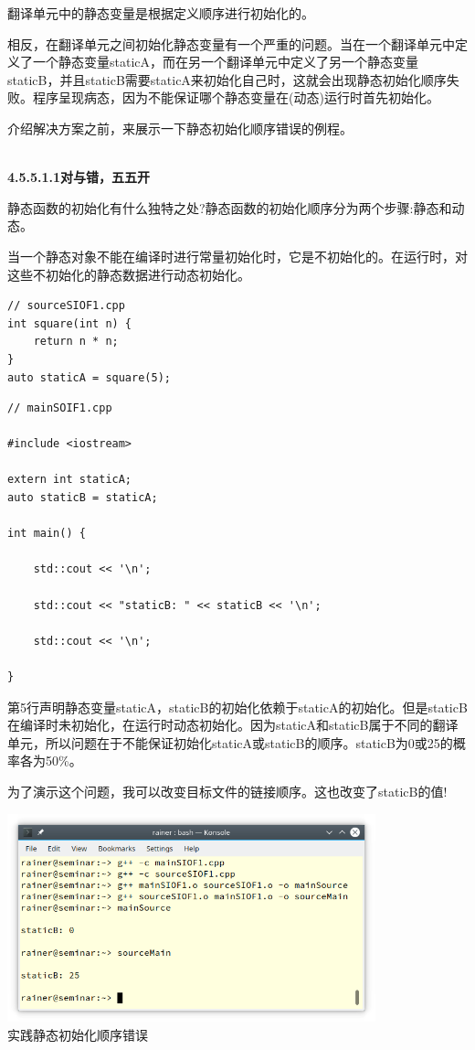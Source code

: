 翻译单元中的静态变量是根据定义顺序进行初始化的。

相反，在翻译单元之间初始化静态变量有一个严重的问题。当在一个翻译单元中定义了一个静态变量staticA，而在另一个翻译单元中定义了另一个静态变量staticB，并且staticB需要staticA来初始化自己时，这就会出现静态初始化顺序失败。程序呈现病态，因为不能保证哪个静态变量在(动态)运行时首先初始化。

介绍解决方案之前，来展示一下静态初始化顺序错误的例程。

\hspace*{\fill} \\ %
\noindent
\textbf{4.5.5.1.1\hspace{0.2cm}对与错，五五开}

静态函数的初始化有什么独特之处?静态函数的初始化顺序分为两个步骤:静态和动态。

当一个静态对象不能在编译时进行常量初始化时，它是不初始化的。在运行时，对这些不初始化的静态数据进行动态初始化。

\begin{lstlisting}[style=styleCXX]
// sourceSIOF1.cpp
int square(int n) {
	return n * n;
}
auto staticA = square(5);
\end{lstlisting}

\begin{lstlisting}[style=styleCXX]
// mainSOIF1.cpp

#include <iostream>

extern int staticA;
auto staticB = staticA;

int main() {
	
	std::cout << '\n';
	
	std::cout << "staticB: " << staticB << '\n';
	
	std::cout << '\n';

}
\end{lstlisting}

第5行声明静态变量staticA，staticB的初始化依赖于staticA的初始化。但是staticB在编译时未初始化，在运行时动态初始化。因为staticA和staticB属于不同的翻译单元，所以问题在于不能保证初始化staticA或staticB的顺序。staticB为0或25的概率各为50\%。

为了演示这个问题，我可以改变目标文件的链接顺序。这也改变了staticB的值!

\begin{center}
\includegraphics[width=0.8\textwidth]{content/3/chapter4/images/37.png}\\
实践静态初始化顺序错误
\end{center}

